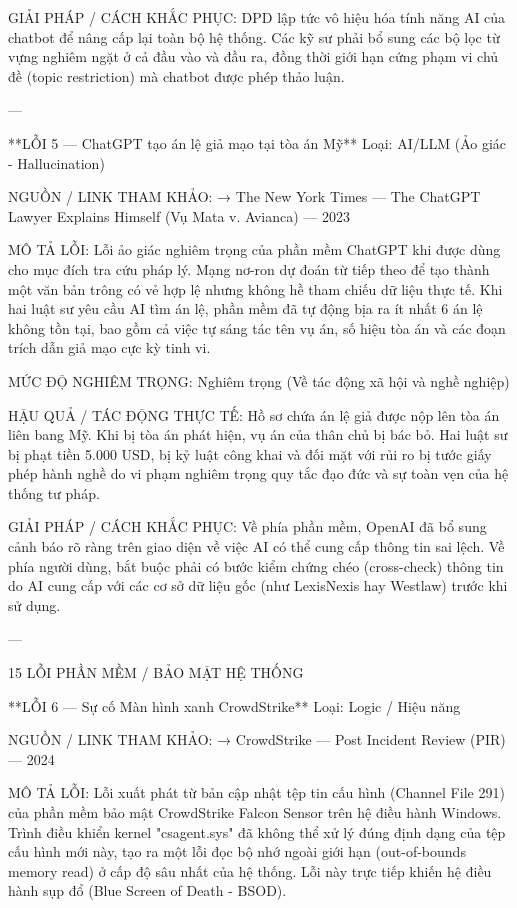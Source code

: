 GIẢI PHÁP / CÁCH KHẮC PHỤC:
DPD lập tức vô hiệu hóa tính năng AI của chatbot để nâng cấp lại toàn bộ hệ thống. Các kỹ sư phải bổ sung các bộ lọc từ vựng nghiêm ngặt ở cả đầu vào và đầu ra, đồng thời giới hạn cứng phạm vi chủ đề (topic restriction) mà chatbot được phép thảo luận.

---

**LỖI 5 — ChatGPT tạo án lệ giả mạo tại tòa án Mỹ**
Loại: AI/LLM (Ảo giác - Hallucination)

NGUỒN / LINK THAM KHẢO:
→ The New York Times — The ChatGPT Lawyer Explains Himself (Vụ Mata v. Avianca) — 2023

MÔ TẢ LỖI:
Lỗi ảo giác nghiêm trọng của phần mềm ChatGPT khi được dùng cho mục đích tra cứu pháp lý. Mạng nơ-ron dự đoán từ tiếp theo để tạo thành một văn bản trông có vẻ hợp lệ nhưng không hề tham chiếu dữ liệu thực tế. Khi hai luật sư yêu cầu AI tìm án lệ, phần mềm đã tự động bịa ra ít nhất 6 án lệ không tồn tại, bao gồm cả việc tự sáng tác tên vụ án, số hiệu tòa án và các đoạn trích dẫn giả mạo cực kỳ tinh vi.

MỨC ĐỘ NGHIÊM TRỌNG:
Nghiêm trọng (Về tác động xã hội và nghề nghiệp)

HẬU QUẢ / TÁC ĐỘNG THỰC TẾ:
Hồ sơ chứa án lệ giả được nộp lên tòa án liên bang Mỹ. Khi bị tòa án phát hiện, vụ án của thân chủ bị bác bỏ. Hai luật sư bị phạt tiền 5.000 USD, bị kỷ luật công khai và đối mặt với rủi ro bị tước giấy phép hành nghề do vi phạm nghiêm trọng quy tắc đạo đức và sự toàn vẹn của hệ thống tư pháp.

GIẢI PHÁP / CÁCH KHẮC PHỤC:
Về phía phần mềm, OpenAI đã bổ sung cảnh báo rõ ràng trên giao diện về việc AI có thể cung cấp thông tin sai lệch. Về phía người dùng, bắt buộc phải có bước kiểm chứng chéo (cross-check) thông tin do AI cung cấp với các cơ sở dữ liệu gốc (như LexisNexis hay Westlaw) trước khi sử dụng.

---

15 LỖI PHẦN MỀM / BẢO MẬT HỆ THỐNG

**LỖI 6 — Sự cố Màn hình xanh CrowdStrike**
Loại: Logic / Hiệu năng

NGUỒN / LINK THAM KHẢO:
→ CrowdStrike — Post Incident Review (PIR) — 2024

MÔ TẢ LỖI:
Lỗi xuất phát từ bản cập nhật tệp tin cấu hình (Channel File 291) của phần mềm bảo mật CrowdStrike Falcon Sensor trên hệ điều hành Windows. Trình điều khiển kernel "csagent.sys" đã không thể xử lý đúng định dạng của tệp cấu hình mới này, tạo ra một lỗi đọc bộ nhớ ngoài giới hạn (out-of-bounds memory read) ở cấp độ sâu nhất của hệ thống. Lỗi này trực tiếp khiến hệ điều hành sụp đổ (Blue Screen of Death - BSOD).

